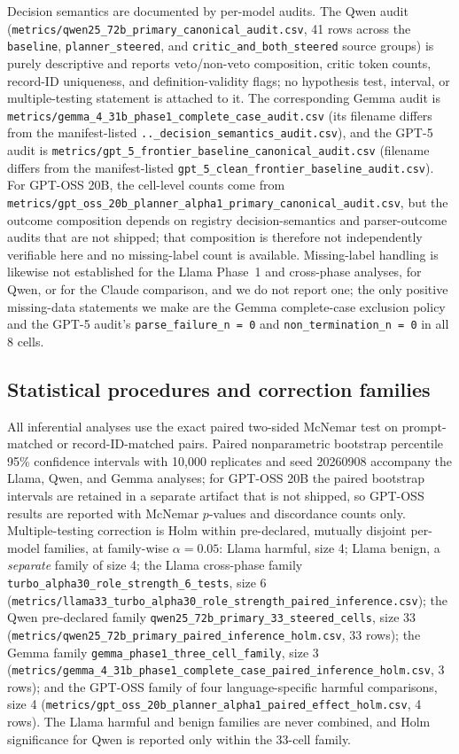 Decision semantics are documented by per-model audits. The Qwen audit
(\texttt{metrics/qwen25\_72b\_primary\_canonical\_audit.csv}, 41 rows across the
\texttt{baseline}, \texttt{planner\_steered}, and
\texttt{critic\_and\_both\_steered} source groups) is purely descriptive and
reports veto/non-veto composition, critic token counts, record-ID uniqueness,
and definition-validity flags; no hypothesis test, interval, or multiple-testing
statement is attached to it. The corresponding Gemma audit is
\texttt{metrics/gemma\_4\_31b\_phase1\_complete\_case\_audit.csv} (its filename
differs from the manifest-listed
\texttt{..\_decision\_semantics\_audit.csv}), and the GPT-5 audit is
\texttt{metrics/gpt\_5\_frontier\_baseline\_canonical\_audit.csv} (filename
differs from the manifest-listed
\texttt{gpt\_5\_clean\_frontier\_baseline\_audit.csv}). For GPT-OSS 20B, the
cell-level counts come from
\texttt{metrics/gpt\_oss\_20b\_planner\_alpha1\_primary\_canonical\_audit.csv},
but the outcome composition depends on registry decision-semantics and
parser-outcome audits that are not shipped; that composition is therefore not
independently verifiable here and no missing-label count is available.
Missing-label handling is likewise not established for the Llama Phase~1 and
cross-phase analyses, for Qwen, or for the Claude comparison, and we do not
report one; the only positive missing-data statements we make are the Gemma
complete-case exclusion policy and the GPT-5 audit's
\texttt{parse\_failure\_n = 0} and \texttt{non\_termination\_n = 0} in all 8
cells.

\subsection{Statistical procedures and correction families}

All inferential analyses use the exact paired two-sided McNemar test on
prompt-matched or record-ID-matched pairs. Paired nonparametric bootstrap
percentile 95\% confidence intervals with 10{,}000 replicates and seed 20260908
accompany the Llama, Qwen, and Gemma analyses; for GPT-OSS 20B the paired
bootstrap intervals are retained in a separate artifact that is not shipped, so
GPT-OSS results are reported with McNemar $p$-values and discordance counts
only. Multiple-testing correction is Holm within pre-declared, mutually disjoint
per-model families, at family-wise $\alpha = 0.05$: Llama harmful, size 4;
Llama benign, a \emph{separate} family of size 4; the Llama cross-phase family
\texttt{turbo\_alpha30\_role\_strength\_6\_tests}, size 6
(\texttt{metrics/llama33\_turbo\_alpha30\_role\_strength\_paired\_inference.csv});
the Qwen pre-declared family \texttt{qwen25\_72b\_primary\_33\_steered\_cells},
size 33
(\texttt{metrics/qwen25\_72b\_primary\_paired\_inference\_holm.csv}, 33 rows);
the Gemma family \texttt{gemma\_phase1\_three\_cell\_family}, size 3
(\texttt{metrics/gemma\_4\_31b\_phase1\_complete\_case\_paired\_inference\_holm.csv},
3 rows); and the GPT-OSS family of four language-specific harmful comparisons,
size 4
(\texttt{metrics/gpt\_oss\_20b\_planner\_alpha1\_paired\_effect\_holm.csv},
4 rows). The Llama harmful and benign families are never combined, and Holm
significance for Qwen is reported only within the 33-cell family.

